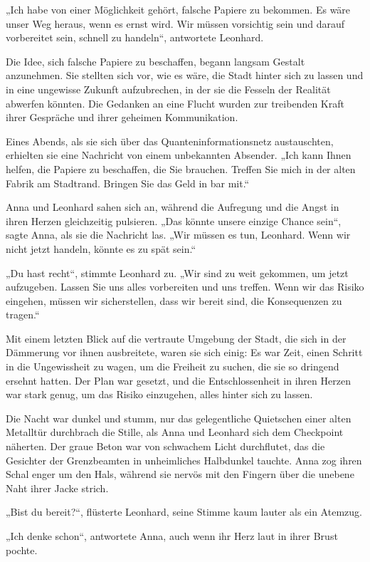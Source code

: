 \documentclass[
]{article}
\begin{document}
„Ich habe von einer Möglichkeit gehört, falsche Papiere zu bekommen. Es
wäre unser Weg heraus, wenn es ernst wird. Wir müssen vorsichtig sein
und darauf vorbereitet sein, schnell zu handeln``, antwortete Leonhard.

Die Idee, sich falsche Papiere zu beschaffen, begann langsam Gestalt
anzunehmen. Sie stellten sich vor, wie es wäre, die Stadt hinter sich zu
lassen und in eine ungewisse Zukunft aufzubrechen, in der sie die
Fesseln der Realität abwerfen könnten. Die Gedanken an eine Flucht
wurden zur treibenden Kraft ihrer Gespräche und ihrer geheimen
Kommunikation.

Eines Abends, als sie sich über das Quanteninformationsnetz
austauschten, erhielten sie eine Nachricht von einem unbekannten
Absender. „Ich kann Ihnen helfen, die Papiere zu beschaffen, die Sie
brauchen. Treffen Sie mich in der alten Fabrik am Stadtrand. Bringen Sie
das Geld in bar mit.``

Anna und Leonhard sahen sich an, während die Aufregung und die Angst in
ihren Herzen gleichzeitig pulsieren. „Das könnte unsere einzige Chance
sein``, sagte Anna, als sie die Nachricht las. „Wir müssen es tun,
Leonhard. Wenn wir nicht jetzt handeln, könnte es zu spät sein.``

„Du hast recht``, stimmte Leonhard zu. „Wir sind zu weit gekommen, um
jetzt aufzugeben. Lassen Sie uns alles vorbereiten und uns treffen. Wenn
wir das Risiko eingehen, müssen wir sicherstellen, dass wir bereit sind,
die Konsequenzen zu tragen.``

Mit einem letzten Blick auf die vertraute Umgebung der Stadt, die sich
in der Dämmerung vor ihnen ausbreitete, waren sie sich einig: Es war
Zeit, einen Schritt in die Ungewissheit zu wagen, um die Freiheit zu
suchen, die sie so dringend ersehnt hatten. Der Plan war gesetzt, und
die Entschlossenheit in ihren Herzen war stark genug, um das Risiko
einzugehen, alles hinter sich zu lassen.

Die Nacht war dunkel und stumm, nur das gelegentliche Quietschen einer
alten Metalltür durchbrach die Stille, als Anna und Leonhard sich dem
Checkpoint näherten. Der graue Beton war von schwachem Licht
durchflutet, das die Gesichter der Grenzbeamten in unheimliches
Halbdunkel tauchte. Anna zog ihren Schal enger um den Hals, während sie
nervös mit den Fingern über die unebene Naht ihrer Jacke strich.

„Bist du bereit?{\kern0pt}``, flüsterte Leonhard, seine Stimme kaum
lauter als ein Atemzug.

„Ich denke schon``, antwortete Anna, auch wenn ihr Herz laut in ihrer
Brust pochte.
\end{document}

